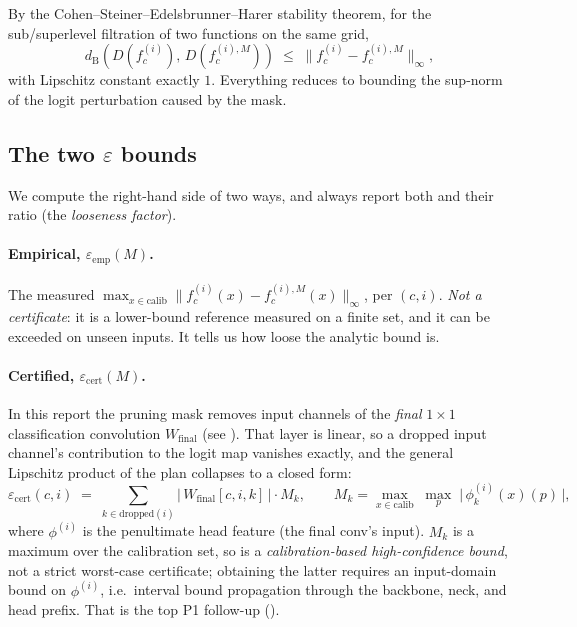 \documentclass[11pt]{article}
\newcommand{\fc}{f_c^{(i)}}
\newcommand{\fcm}{f_c^{(i),M}}
\newcommand{\dB}{d_{\mathrm B}}
\newcommand{\epscert}{\varepsilon_{\mathrm{cert}}}
\newcommand{\epsemp}{\varepsilon_{\mathrm{emp}}}
\theoremstyle{definition}
\theoremstyle{plain}
\begin{document}
By the Cohen--Steiner--Edelsbrunner--Harer stability theorem, for the
sub/superlevel filtration of two functions on the same grid,
\begin{equation}
\dB\!\left(D(\fc),\, D(\fcm)\right) \;\le\; \bigl\lVert \fc - \fcm \bigr\rVert_\infty ,
\label{eq:stability}
\end{equation}
with Lipschitz constant exactly $1$. Everything reduces to bounding the sup-norm
of the logit perturbation caused by the mask.

\subsection{The two $\varepsilon$ bounds}

We compute the right-hand side of  two ways, and always report
both and their ratio (the \emph{looseness factor}).

\paragraph{Empirical, $\epsemp(M)$.} The measured
$\max_{x \in \text{calib}} \lVert \fc(x) - \fcm(x)\rVert_\infty$, per $(c,i)$.
\emph{Not a certificate}: it is a lower-bound reference measured on a finite set,
and it can be exceeded on unseen inputs. It tells us how loose the analytic bound
is.

\paragraph{Certified, $\epscert(M)$.} In this report the pruning mask removes
input channels of the \emph{final} $1\times1$ classification convolution
$W_{\text{final}}$ (see ). That layer is linear, so a dropped
input channel's contribution to the logit map vanishes exactly, and the general
Lipschitz product of the plan collapses to a closed form:
\begin{equation}
\epscert(c,i) \;=\; \sum_{k \in \text{dropped}(i)}
\bigl|\, W_{\text{final}}[c,i,k]\,\bigr| \cdot M_k , \qquad
M_k = \max_{x \in \text{calib}}\; \max_{p}\; \bigl|\,\phi_k^{(i)}(x)(p)\,\bigr|,
\label{eq:epscert}
\end{equation}
where $\phi^{(i)}$ is the penultimate head feature (the final conv's input).
$M_k$ is a maximum over the calibration set, so  is a
\emph{calibration-based high-confidence bound}, not a strict worst-case
certificate; obtaining the latter requires an input-domain bound on
$\phi^{(i)}$, i.e.\ interval bound propagation through the backbone, neck, and
head prefix. That is the top P1 follow-up ().
\end{document}
